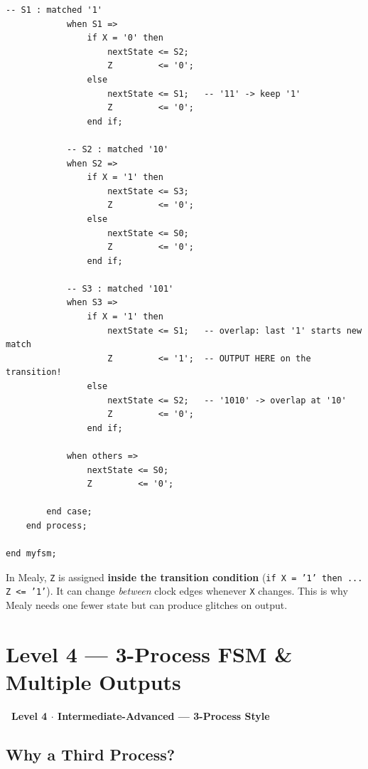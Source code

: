 \documentclass[12pt,a4paper]{article}
\newcommand{\faUnlock}{\ding{109}}
\newcommand{\levelbadge}[2]{%
  \begin{tcolorbox}[colback=#2!15, colframe=#2, arc=20pt,
    left=4pt, right=4pt, top=2pt, bottom=2pt,
    width=\linewidth, boxrule=1pt]
    \centering\sffamily\bfseries\large #1
  \end{tcolorbox}%
}
\begin{document}
\begin{tcolorbox}[vhdlbox, title={Level 3 --- mealy\_1011.vhd}]
\begin{lstlisting}[style=vhdlstyle]
            -- S1 : matched '1'
            when S1 =>
                if X = '0' then
                    nextState <= S2;
                    Z         <= '0';
                else
                    nextState <= S1;   -- '11' -> keep '1'
                    Z         <= '0';
                end if;

            -- S2 : matched '10'
            when S2 =>
                if X = '1' then
                    nextState <= S3;
                    Z         <= '0';
                else
                    nextState <= S0;
                    Z         <= '0';
                end if;

            -- S3 : matched '101'
            when S3 =>
                if X = '1' then
                    nextState <= S1;   -- overlap: last '1' starts new match
                    Z         <= '1';  -- OUTPUT HERE on the transition!
                else
                    nextState <= S2;   -- '1010' -> overlap at '10'
                    Z         <= '0';
                end if;

            when others =>
                nextState <= S0;
                Z         <= '0';

        end case;
    end process;

end myfsm;
\end{lstlisting}
\end{tcolorbox}

\begin{tcolorbox}[notebox, title={Mealy Key Point}]
  In Mealy, \texttt{Z} is assigned \textbf{inside the transition condition}
  (\texttt{if X = '1' then ... Z <= '1'}).
  It can change \textit{between} clock edges whenever \texttt{X} changes.
  This is why Mealy needs one fewer state but can produce glitches on output.
\end{tcolorbox}

\newpage

\section{Level 4 --- 3-Process FSM \& Multiple Outputs}

\levelbadge{\faUnlock\ Level 4 $\cdot$ Intermediate-Advanced --- 3-Process Style}{accentblue!50!black}

\subsection{Why a Third Process?}
\end{document}
